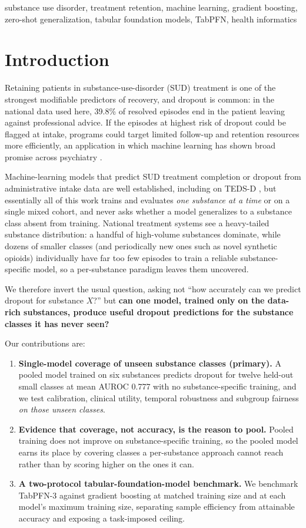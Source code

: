 \documentclass[conference]{IEEEtran}
\begin{document}
\begin{IEEEkeywords}
substance use disorder, treatment retention, machine learning, gradient boosting,
zero-shot generalization, tabular foundation models, TabPFN, health informatics
\end{IEEEkeywords}

\section{Introduction}
Retaining patients in substance-use-disorder (SUD) treatment is one of the strongest modifiable
predictors of recovery, and dropout is common: in the national data used here, 39.8\% of resolved
episodes end in the patient leaving against professional advice. If the episodes at highest risk of dropout
could be flagged at intake, programs could target limited follow-up and retention resources more
efficiently, an application in which machine learning has shown broad promise across psychiatry
\cite{chekroud_ml_psych}.

Machine-learning models that predict SUD treatment completion or dropout from administrative
intake data are well established, including on TEDS-D
\cite{ml_teds_disparities,ml_jamia,attrition2025,sud_ml_review}, but essentially all of this
work trains and evaluates \emph{one substance at a time} or on a single mixed cohort, and never
asks whether a model generalizes to a substance class absent from training. National treatment
systems see a heavy-tailed substance distribution: a handful of high-volume substances dominate,
while dozens of smaller classes (and periodically new ones such as novel synthetic opioids)
individually have far too few episodes to train a reliable substance-specific model, so a
per-substance paradigm leaves them uncovered.

We therefore invert the usual question, asking not ``how accurately can we predict dropout for
substance $X$?'' but \textbf{can one model, trained only on the data-rich substances, produce
useful dropout predictions for the substance classes it has never seen?}

Our contributions are:
\begin{enumerate}
\item \textbf{Single-model coverage of unseen substance classes (primary).} A pooled model
trained on six substances predicts dropout for twelve held-out small classes at mean AUROC 0.777
with no substance-specific training, and we test calibration, clinical utility, temporal
robustness and subgroup fairness \emph{on those unseen classes}.
\item \textbf{Evidence that coverage, not accuracy, is the reason to pool.} Pooled training does
not improve on substance-specific training, so the pooled model earns its place by covering
classes a per-substance approach cannot reach rather than by scoring higher on the ones it can.
\item \textbf{A two-protocol tabular-foundation-model benchmark.} We benchmark TabPFN-3
\cite{tabpfn_nature} against gradient boosting at matched training size and at each model's
maximum training size, separating sample efficiency from attainable accuracy and exposing a
task-imposed ceiling.
\end{enumerate}
\end{document}
